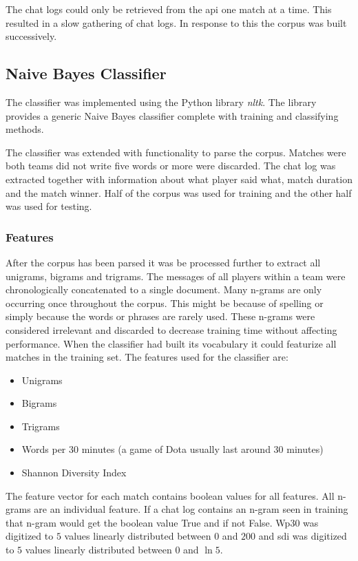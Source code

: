 \documentclass[12pt,a4paper]{article}
\begin{document}
The chat logs could only be retrieved from the api one match at a time.
This resulted in a slow gathering of chat logs.
In response to this the corpus was built successively.

\subsection{Naive Bayes Classifier}
The classifier was implemented using the Python library \textit{nltk}.
The library provides a generic Naive Bayes classifier complete with training and classifying methods.

The classifier was extended with functionality to parse the corpus.
Matches were both teams did not write five words or more were discarded.
The chat log was extracted together with information about what player said what,
match duration and the match winner.
Half of the corpus was used for training and the other half was used for testing.

\subsubsection{Features}
\label{sec:feats}
After the corpus has been parsed it was be processed further to extract all unigrams, bigrams and trigrams.
The messages of all players within a team were chronologically concatenated to a single document.
Many n-grams are only occurring once throughout the corpus.
This might be because of spelling or simply because the words or phrases are rarely used.
These n-grams were considered irrelevant and discarded to decrease training time without affecting performance.
When the classifier had built its vocabulary it could featurize all matches in the training set.
The features used for the classifier are:
\begin{itemize}
    \item Unigrams
    \item Bigrams
    \item Trigrams
    \item Words per 30 minutes (a game of Dota usually last around 30 minutes)
    \item Shannon Diversity Index
\end{itemize}
The feature vector for each match contains boolean values for all features. All n-grams are an individual feature.
If a chat log contains an n-gram seen in training that n-gram would get the boolean value True and if not False.
Wp30 was digitized to $5$ values linearly distributed between $0$ and $200$
and sdi was digitized to $5$ values linearly distributed between $0$ and $\ln{5}$.
\end{document}
